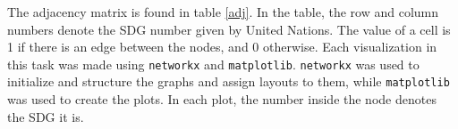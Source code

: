\documentclass[11pt,a4paper,titlepage]{article}
\begin{document}
\begin{table}[h!]
    \centering
    \renewcommand{\arraystretch}{1}
    \caption{Adjacency matrix of SDGs}
    \label{adj}
\end{table}

The adjacency matrix is found in table \ref{adj}. In the table, the row and column numbers denote the SDG number given by United Nations. The value of a cell is 1 if there is an edge between the nodes, and 0 otherwise. Each visualization in this task was made using \texttt{networkx} and \texttt{matplotlib}. \texttt{networkx} was used to initialize and structure the graphs and assign layouts to them, while \texttt{matplotlib} was used to create the plots. In each plot, the number inside the node denotes the SDG it is.
\end{document}
